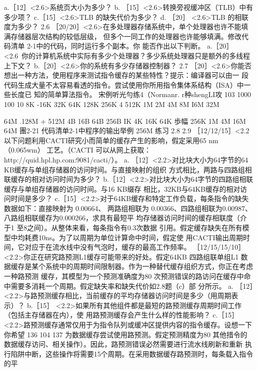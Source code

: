 a.［12］<2.6>系统页大小为多少？
b. ［15］<2.6>转换旁视缓冲区（TLB）中有多少项？
c.［15］<2.6>TLB 的缺失代价为多少？
d. ［20］ <2.6>TLB 的相联度为多少？
2.6
［20/20］<2.6>在多处理器存储系统中，单个处理器也许不能填满存储器层次结构的较低层级，
但多个一同工作的处理器也许能够填满。修改代码清单 2-1中的代码，同时运行多个副本。你
能否作出以下判断。
a.［20］<2.6~你的计算机系统中实际有多少个处理器？多少系统处理器只是额外的多线程上下文？
b.［20］<2.6>你的系统有多少存储器控制器？
2.7
［20］<2.6>你能否想出一种方法，使用程序来测试指令缓存的某些特性？提示：编译器可以由一
段代码生成大量不太容易看透的指令。尝试使用你所用指令集体系结构（ISA）中一些长度已
知的简单算法指令。
宋例听光勻练4（Normanr.
r种shengLI攻
103
1000
100
10
 8K
-16K
32K
64K
128K
256K
4 512K
1M
2M
4M
8M
I6M
32M

64M
.128M
+ 512M
4B
16B
64B
256B
IK
4K
16K
64K
歩幅
256K
1M
4M
16M
64M
團2-21 代码清单2-1中程序的输出举例
256M
练习
2.8
2.9
［12/12/15］<2.2以下问题利用CACTI研究小而简单的缓存产生的影响，假定采用65 nm （0.065wm）
工艺。（CACTI 可以从网上获取：http://quid.hpl.hp.com:9081/cacti/）。
a. ［12］<2.2>对比块大小为64字节的64 KB缓存与单组存储器的访问时间。与直接映射的组织
方式相比，两路与四路组相联缓存的相对访问时间为多少？
b.［12］<2.2>对比块大小为64字节的四路组相联缓存与单组存储器的访问时间。与16 KB缀存
相比，32KB与64KB缓存的相对访问时间是多少？
c.［15］<2.2>对于64KB缓存和特定工作负载，每条指令的缺失数据如下：直接映射为 0.00664、
两路组相联为 0.00366、四路组相联为0.00987、八路组相联缓存为0.000266，求具有最短平
均存储器访问时间的缓存相联度（介于1 至8之间）。从整体来看，每条指令有0.3次数据
引用。假定缓存缺失在所有模型中均耗费10ns。为了以周期为单位计算命中时间，假定使
用CACTI输出周期时间，它对应于在流水线中没有气泡时，缓存的最高工作频率。
［12/15/15/10］<2.2>你正在研究路预测L1缓存可能带来的好处。假定64KB 四路组联单组L1 数
据缓存是某个系统中的周期时间限制器。作为一种替代缓存组织方式，你正在考虑一种路预测
缓存，其模型为一个预测准确度为80%
次预测错误的路访问在缓存中命中需要多消耗一个周期。假定缺失率和缺失代价如2.8题（c）部
分所示。
a. ［12］<2.2>与路预测缓存相比，当前缓存的平均存储器访问时间是多少（用周期表示）？
b.［15］ <2.2>如果所有其他组件都是最短的路预测缓存周期时间工作（包括主存储器在内），使
用路预测缓存会产生什么样的性能影响？
c.［15］<2.2>路预测缓存通常仅用于为指令队列或缓冲区提供内容的指令缓存。设想一下你希望
136
104
137
为数据缓存尝试使用路预测。假定预测精度为80%
其他措令的数据缓存访问、相关操作）。因此，路预测错误必然需要进行流水线刷新和重新
执行陷阱中断，这些操作将需要15个周期。在采用数据缓存路预测时，每条载入指令的平
